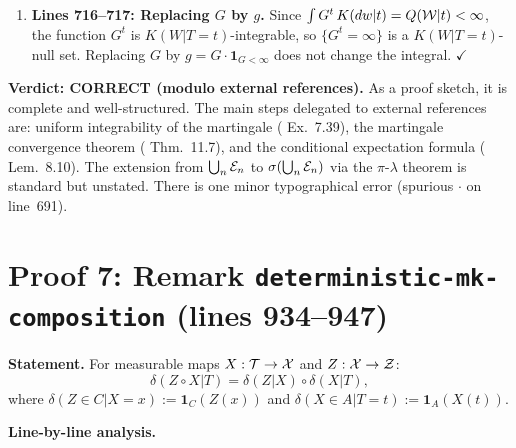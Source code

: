 \documentclass{article}
\begin{document}
\begin{enumerate}[leftmargin=*]
    This step is stated without detailed justification.  The rigorous argument
    uses the Dynkin $\pi$-$\lambda$ theorem: the collection
    $\Dcal := \{D\in\Bcal_\Wcal : \int\mathbf{1}_D G^t\,K(dw|t)=Q(D|t)\}$
    is a $\lambda$-system (contains $\Wcal$; closed under complements and
    countable disjoint unions---the latter by monotone convergence, using
    $G^t\ge 0$) and contains the $\pi$-system
    $\bigcup_n\Ecal_n\cup\{\emptyset\}$.  Therefore
    $\Bcal_\Wcal = \sigma(\bigcup_n\Ecal_n) \subseteq \Dcal$.

    The argument is standard but \textbf{omitted from the proof sketch}.
    Not a gap per se (it's labeled a sketch), but the $\pi$-$\lambda$
    step deserves mention.

  \item \textbf{Lines 716--717: Replacing $G$ by $g$.}
    Since $\int G^t\,K(dw|t) = Q(\mathcal{W}|t) < \infty$, the function $G^t$ is
    $K(W|T=t)$-integrable, so $\{G^t=\infty\}$ is a $K(W|T=t)$-null set.
    Replacing $G$ by $g = G\cdot\mathbf{1}_{G<\infty}$ does not change the
    integral.  $\checkmark$
\end{enumerate}

\textbf{Verdict: CORRECT (modulo external references).}
As a proof sketch, it is complete and well-structured.  The main steps
delegated to external references are: uniform integrability of the
martingale (\cite{Kle20} Ex.\ 7.39), the martingale convergence theorem
(\cite{Kle20} Thm.\ 11.7), and the conditional expectation formula
(\cite{Kle20} Lem.\ 8.10).
The extension from $\bigcup_n\mathcal{E}_n$ to $\sigma(\bigcup_n\mathcal{E}_n)$ via the
$\pi$-$\lambda$ theorem is standard but unstated.
There is one minor typographical error (spurious $\cdot$ on line~691).

\section{Proof 7: Remark \texttt{deterministic-mk-composition} (lines 934--947)}

\textbf{Statement.} For measurable maps $X:\mathcal{T}\to\mathcal{X}$ and $Z:\mathcal{X}\to\mathcal{Z}$:
\[ \delta(Z\circ X|T) = \delta(Z|X) \circ \delta(X|T), \]
where $\delta(Z\in C|X=x) := \mathbf{1}_C(Z(x))$ and
$\delta(X\in A|T=t) := \mathbf{1}_A(X(t))$.

\textbf{Line-by-line analysis.}
\end{document}
